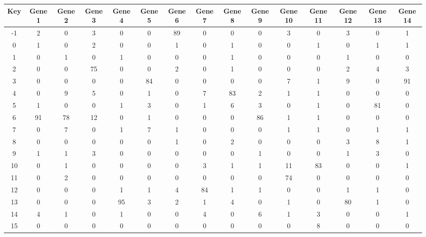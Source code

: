 \begin{tabular}{|c|c|c|c|c|c|c|c|c|c|c|c|c|c|c|}
\hline
Key & Gene 1 & Gene 2 & Gene 3 & Gene 4 & Gene 5 & Gene 6 & Gene 7 & Gene 8 & Gene 9 & Gene 10 & Gene 11 & Gene 12 & Gene 13 & Gene 14 \\
\hline
-1 & 2 & 0 & 3 & 0 & 0 & 89 & 0 & 0 & 0 & 3 & 0 & 3 & 0 & 1 \\
0 & 1 & 0 & 2 & 0 & 0 & 1 & 0 & 1 & 0 & 0 & 1 & 0 & 1 & 1 \\
1 & 0 & 1 & 0 & 1 & 0 & 0 & 0 & 1 & 0 & 0 & 0 & 1 & 0 & 0 \\
2 & 0 & 0 & 75 & 0 & 0 & 2 & 0 & 1 & 0 & 0 & 0 & 2 & 4 & 3 \\
3 & 0 & 0 & 0 & 0 & 84 & 0 & 0 & 0 & 0 & 7 & 1 & 9 & 0 & 91 \\
4 & 0 & 9 & 5 & 0 & 1 & 0 & 7 & 83 & 2 & 1 & 1 & 0 & 0 & 0 \\
5 & 1 & 0 & 0 & 1 & 3 & 0 & 1 & 6 & 3 & 0 & 1 & 0 & 81 & 0 \\
6 & 91 & 78 & 12 & 0 & 1 & 0 & 0 & 0 & 86 & 1 & 1 & 0 & 0 & 0 \\
7 & 0 & 7 & 0 & 1 & 7 & 1 & 0 & 0 & 0 & 1 & 1 & 0 & 1 & 1 \\
8 & 0 & 0 & 0 & 0 & 0 & 1 & 0 & 2 & 0 & 0 & 0 & 3 & 8 & 1 \\
9 & 1 & 1 & 3 & 0 & 0 & 0 & 0 & 0 & 1 & 0 & 0 & 1 & 3 & 0 \\
10 & 0 & 1 & 0 & 0 & 0 & 0 & 3 & 1 & 1 & 11 & 83 & 0 & 0 & 1 \\
11 & 0 & 2 & 0 & 0 & 0 & 0 & 0 & 0 & 0 & 74 & 0 & 0 & 0 & 0 \\
12 & 0 & 0 & 0 & 1 & 1 & 4 & 84 & 1 & 1 & 0 & 0 & 1 & 1 & 0 \\
13 & 0 & 0 & 0 & 95 & 3 & 2 & 1 & 4 & 0 & 1 & 0 & 80 & 1 & 0 \\
14 & 4 & 1 & 0 & 1 & 0 & 0 & 4 & 0 & 6 & 1 & 3 & 0 & 0 & 1 \\
15 & 0 & 0 & 0 & 0 & 0 & 0 & 0 & 0 & 0 & 0 & 8 & 0 & 0 & 0 \\
\hline
\end{tabular}